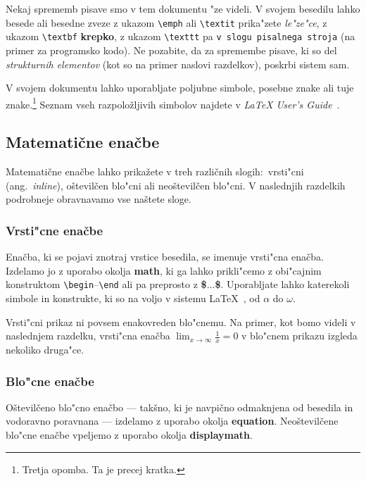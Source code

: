 \documentclass[sigconf,nonacm]{acmart}
\begin{document}
Nekaj sprememb pisave smo v tem dokumentu "ze videli.  V svojem besedilu lahko
besede ali besedne zveze z ukazom \texttt{\textbackslash{}emph} ali
\texttt{\textbackslash{}textit} prika"zete \emph{le"ze"ce}, z ukazom
\texttt{\textbackslash{}textbf} \textbf{krepko}, z ukazom
\texttt{\textbackslash{}texttt} pa \texttt{v slogu pisalnega stroja} (na
primer za programsko kodo).  Ne pozabite, da za spremembe pisave, ki so del
\emph{strukturnih elementov} (kot so na primer naslovi razdelkov), poskrbi
sistem sam.

V svojem dokumentu lahko uporabljate poljubne simbole, posebne znake
ali tuje znake.\footnote{Tretja opomba. Ta je precej kratka.} Seznam vseh
razpoložljivih simbolov najdete v \emph{\LaTeX{} User's
Guide}~\cite{Lamport:LaTeX}.

\subsection{Matematične enačbe}

Matematične enačbe lahko prikažete v treh različnih slogih:\ vrsti"cni (ang.\
\emph{inline}), oštevilčen blo"cni ali neoštevilčen blo"cni.  V naslednjih
razdelkih podrobneje obravnavamo vse naštete sloge.

\subsubsection{Vrsti"cne enačbe}

Enačba, ki se pojavi znotraj vrstice besedila, se imenuje vrsti"cna enačba.
Izdelamo jo z uporabo okolja \textbf{math}, ki ga lahko prikli"cemo z
obi"cajnim konstruktom
\texttt{\textbackslash{}begin}--\texttt{\textbackslash{}end} ali pa preprosto
z \textbf{\$$\ldots$\$}.  Uporabljate lahko katerekoli simbole in konstrukte,
ki so na voljo v sistemu \LaTeX~\cite{Lamport:LaTeX}, od $\alpha$ do $\omega$.

Vrsti"cni prikaz ni povsem enakovreden blo"cnemu. Na primer, kot bomo videli
v naslednjem razdelku, vrsti"cna enačba
\begin{math}\lim_{x\rightarrow \infty}\frac{1}{x}=0\end{math} 
v blo"cnem prikazu izgleda nekoliko druga"ce.

\subsubsection{Blo"cne enačbe}

Oštevilčeno blo"cno enačbo --- takšno, ki je navpično odmaknjena od besedila
in vodoravno poravnana --- izdelamo z uporabo okolja \textbf{equation}.
Neoštevilčene blo"cne enačbe vpeljemo z uporabo okolja \textbf{displaymath}.
\end{document}
